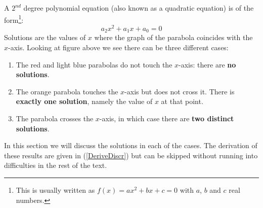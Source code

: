 \noindent A $2^{nd}$ degree polynomial equation (also known as a quadratic equation) is of the form\footnote{This is usually written as $f(x) = ax^2 + bx + c = 0$ with $a$, $b$ and $c$ real numbers.}:
\begin{equation}
\label{QuadrEq1}
a_2 x^2 + a_1 x + a_0 = 0
\end{equation}
\noindent Solutions are the values of $x$ where the graph of the parabola coincides with the $x$-axis. Looking at figure above we see there can be three different cases:
\begin{enumerate}
\item The red and light blue parabolas do not touch the $x$-axis: there are \textbf{no solutions}.
\item The orange parabola touches the $x$-axis but does not cross it. There is \textbf{exactly one solution}, namely the value of $x$ at that point.
\item The parabola crosses the $x$-axis, in which case there are \textbf{two distinct solutions}.
\end{enumerate}
\noindent In this section we will discuss the solutions in each of the cases. The derivation of these results are given in (\ref{DeriveDiscr}) but can be skipped without running into difficulties in the rest of the text.\\

